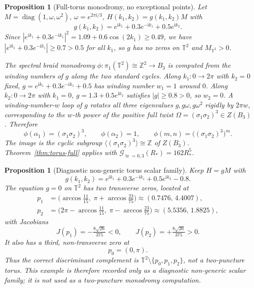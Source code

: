 \documentclass[11pt]{article}
\newtheorem{proposition}[theorem]{Proposition}
\numberwithin{equation}{section}
\DeclareMathOperator{\tr}{tr}
\DeclareMathOperator{\diag}{diag}
\newcommand{\bbZ}{\mathbb Z}
\newcommand{\bbT}{\mathbb T}
\newcommand{\cG}{\mathcal G}
\newcommand{\ii}{\mathrm i}
\begin{document}
\begin{proposition}[Full-torus monodromy, no exceptional points]
\label{prop:T2-no-puncture}
Let $M=\diag(1,\omega,\omega^2)$, $\omega=e^{2\pi\ii/3}$,
$H(k_1,k_2)=g(k_1,k_2)M$ with
\[
  g(k_1,k_2)=e^{\ii k_1}+0.3e^{-\ii k_1}+0.5e^{\ii k_2}.
\]
Since $|e^{\ii k_1}+0.3e^{-\ii k_1}|^2=1.09+0.6\cos(2k_1)\ge0.49$, we
have $|e^{\ii k_1}+0.3e^{-\ii k_1}|\ge0.7>0.5$ for all $k_1$, so $g$
has no zeros on $\bbT^2$ and $M_{\bbT^2}>0$.

The spectral braid monodromy $\phi:\pi_1(\bbT^2)\cong\bbZ^2\to B_3$ is
computed from the winding numbers of $g$ along the two standard cycles.
Along $k_1:0\to2\pi$ with $k_2=0$ fixed, $g=e^{\ii k_1}+0.3e^{-\ii k_1}+0.5$
has winding number $w_1=1$ around $0$.  Along $k_2:0\to2\pi$ with $k_1=0$,
$g=1.3+0.5e^{\ii k_2}$ satisfies $|g|\ge0.8>0$, so $w_2=0$.
A winding-number-$w$ loop of $g$ rotates all three eigenvalues
$g,g\omega,g\omega^2$ rigidly by $2\pi w$, corresponding to the $w$-th power
of the positive full twist $\Omega=(\sigma_1\sigma_2)^3\in Z(B_3)$.
Therefore
\[
  \phi(\alpha_1)=(\sigma_1\sigma_2)^3,\qquad\phi(\alpha_2)=1,
  \qquad\phi(m,n)=\bigl((\sigma_1\sigma_2)^3\bigr)^m.
\]
The image is the cyclic subgroup
\(\langle(\sigma_1\sigma_2)^3\rangle\cong\bbZ\) of \(Z(B_3)\).
Theorem~\ref{thm:torus-full} applies with
$\cG_{\tr=0,3}(R_*)=162R_*^5$.
\end{proposition}

\begin{proposition}[Diagnostic non-generic torus scalar family]
\label{prop:T2-degenerate-three-zero}
Keep $H=gM$ with
\[
  g(k_1,k_2)=e^{\ii k_1}+0.3e^{-\ii k_1}+0.5e^{\ii k_2}-0.8.
\]
The equation $g=0$ on $\bbT^2$ has two transverse zeros, located at
\begin{align*}
  p_1 &= \bigl(\arccos\tfrac{11}{15},\;\pi+\arccos\tfrac{23}{75}\bigr)
        \approx(0.7476,\,4.4007),\\
  p_2 &= \bigl(2\pi-\arccos\tfrac{11}{15},\;\pi-\arccos\tfrac{23}{75}\bigr)
        \approx(5.5356,\,1.8825),
\end{align*}
with Jacobians
\[
  J(p_1)=-\tfrac{8\sqrt{26}}{375}<0,\qquad J(p_2)=+\tfrac{8\sqrt{26}}{375}>0.
\]
It also has a third, non-transverse zero at
\[
  p_0=(0,\pi).
\]
Thus the correct discriminant complement is
\(\bbT^2\setminus\{p_0,p_1,p_2\}\), not a two-puncture torus.  This example is
therefore recorded only as a diagnostic non-generic scalar family; it is not
used as a two-puncture monodromy computation.
\end{proposition}
\end{document}
